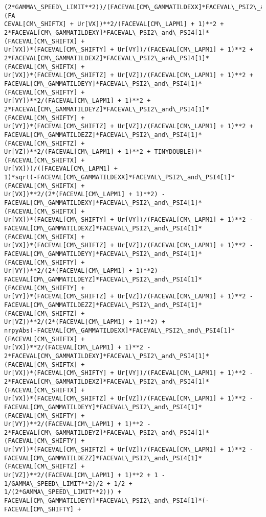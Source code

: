 \documentclass[landscape,letterpaper,10pt,english]{article}
\begin{document}
\begin{Verbatim}[commandchars=\\\{\}]
(2*GAMMA\_SPEED\_LIMIT**2))/(FACEVAL[CM\_GAMMATILDEXX]*FACEVAL\_PSI2\_and\_PSI4[1]*(FA
CEVAL[CM\_SHIFTX] + Ur[VX])**2/(FACEVAL[CM\_LAPM1] + 1)**2 +
2*FACEVAL[CM\_GAMMATILDEXY]*FACEVAL\_PSI2\_and\_PSI4[1]*(FACEVAL[CM\_SHIFTX] +
Ur[VX])*(FACEVAL[CM\_SHIFTY] + Ur[VY])/(FACEVAL[CM\_LAPM1] + 1)**2 +
2*FACEVAL[CM\_GAMMATILDEXZ]*FACEVAL\_PSI2\_and\_PSI4[1]*(FACEVAL[CM\_SHIFTX] +
Ur[VX])*(FACEVAL[CM\_SHIFTZ] + Ur[VZ])/(FACEVAL[CM\_LAPM1] + 1)**2 +
FACEVAL[CM\_GAMMATILDEYY]*FACEVAL\_PSI2\_and\_PSI4[1]*(FACEVAL[CM\_SHIFTY] +
Ur[VY])**2/(FACEVAL[CM\_LAPM1] + 1)**2 +
2*FACEVAL[CM\_GAMMATILDEYZ]*FACEVAL\_PSI2\_and\_PSI4[1]*(FACEVAL[CM\_SHIFTY] +
Ur[VY])*(FACEVAL[CM\_SHIFTZ] + Ur[VZ])/(FACEVAL[CM\_LAPM1] + 1)**2 +
FACEVAL[CM\_GAMMATILDEZZ]*FACEVAL\_PSI2\_and\_PSI4[1]*(FACEVAL[CM\_SHIFTZ] +
Ur[VZ])**2/(FACEVAL[CM\_LAPM1] + 1)**2 + TINYDOUBLE))*(FACEVAL[CM\_SHIFTX] +
Ur[VX]))/((FACEVAL[CM\_LAPM1] +
1)*sqrt(-FACEVAL[CM\_GAMMATILDEXX]*FACEVAL\_PSI2\_and\_PSI4[1]*(FACEVAL[CM\_SHIFTX] +
Ur[VX])**2/(2*(FACEVAL[CM\_LAPM1] + 1)**2) -
FACEVAL[CM\_GAMMATILDEXY]*FACEVAL\_PSI2\_and\_PSI4[1]*(FACEVAL[CM\_SHIFTX] +
Ur[VX])*(FACEVAL[CM\_SHIFTY] + Ur[VY])/(FACEVAL[CM\_LAPM1] + 1)**2 -
FACEVAL[CM\_GAMMATILDEXZ]*FACEVAL\_PSI2\_and\_PSI4[1]*(FACEVAL[CM\_SHIFTX] +
Ur[VX])*(FACEVAL[CM\_SHIFTZ] + Ur[VZ])/(FACEVAL[CM\_LAPM1] + 1)**2 -
FACEVAL[CM\_GAMMATILDEYY]*FACEVAL\_PSI2\_and\_PSI4[1]*(FACEVAL[CM\_SHIFTY] +
Ur[VY])**2/(2*(FACEVAL[CM\_LAPM1] + 1)**2) -
FACEVAL[CM\_GAMMATILDEYZ]*FACEVAL\_PSI2\_and\_PSI4[1]*(FACEVAL[CM\_SHIFTY] +
Ur[VY])*(FACEVAL[CM\_SHIFTZ] + Ur[VZ])/(FACEVAL[CM\_LAPM1] + 1)**2 -
FACEVAL[CM\_GAMMATILDEZZ]*FACEVAL\_PSI2\_and\_PSI4[1]*(FACEVAL[CM\_SHIFTZ] +
Ur[VZ])**2/(2*(FACEVAL[CM\_LAPM1] + 1)**2) +
nrpyAbs(-FACEVAL[CM\_GAMMATILDEXX]*FACEVAL\_PSI2\_and\_PSI4[1]*(FACEVAL[CM\_SHIFTX] +
Ur[VX])**2/(FACEVAL[CM\_LAPM1] + 1)**2 -
2*FACEVAL[CM\_GAMMATILDEXY]*FACEVAL\_PSI2\_and\_PSI4[1]*(FACEVAL[CM\_SHIFTX] +
Ur[VX])*(FACEVAL[CM\_SHIFTY] + Ur[VY])/(FACEVAL[CM\_LAPM1] + 1)**2 -
2*FACEVAL[CM\_GAMMATILDEXZ]*FACEVAL\_PSI2\_and\_PSI4[1]*(FACEVAL[CM\_SHIFTX] +
Ur[VX])*(FACEVAL[CM\_SHIFTZ] + Ur[VZ])/(FACEVAL[CM\_LAPM1] + 1)**2 -
FACEVAL[CM\_GAMMATILDEYY]*FACEVAL\_PSI2\_and\_PSI4[1]*(FACEVAL[CM\_SHIFTY] +
Ur[VY])**2/(FACEVAL[CM\_LAPM1] + 1)**2 -
2*FACEVAL[CM\_GAMMATILDEYZ]*FACEVAL\_PSI2\_and\_PSI4[1]*(FACEVAL[CM\_SHIFTY] +
Ur[VY])*(FACEVAL[CM\_SHIFTZ] + Ur[VZ])/(FACEVAL[CM\_LAPM1] + 1)**2 -
FACEVAL[CM\_GAMMATILDEZZ]*FACEVAL\_PSI2\_and\_PSI4[1]*(FACEVAL[CM\_SHIFTZ] +
Ur[VZ])**2/(FACEVAL[CM\_LAPM1] + 1)**2 + 1 - 1/GAMMA\_SPEED\_LIMIT**2)/2 + 1/2 +
1/(2*GAMMA\_SPEED\_LIMIT**2))) +
FACEVAL[CM\_GAMMATILDEYY]*FACEVAL\_PSI2\_and\_PSI4[1]*(-FACEVAL[CM\_SHIFTY] +

\end{Verbatim}
\end{document}

